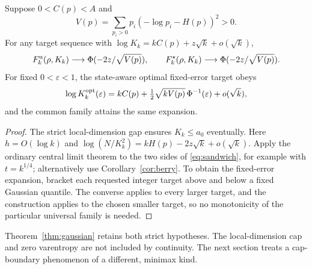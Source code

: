 \begin{theorem}\label{thm:gaussian}
Suppose $0<C(p)<A$ and
\[
 V(p)=\sum_{p_i>0}p_i(-\log p_i-H(p))^2>0.
\]
For any target sequence with $\log K_k=kC(p)+z\sqrt k+o(\sqrt k)$,
\begin{equation}\label{eq:gaussian-limit}
 F_k^{\rm u}(\rho,K_k)\longrightarrow\Phi(-2z/\sqrt{V(p)}),\qquad
 F_k^\star(\rho,K_k)\longrightarrow\Phi(-2z/\sqrt{V(p)}).
\end{equation}
For fixed $0<\varepsilon<1$, the state-aware optimal fixed-error target obeys
\[
 \log K_k^{\rm opt}(\varepsilon)=kC(p)
 +\tfrac12\sqrt{kV(p)}\,\Phi^{-1}(\varepsilon)+o(\sqrt k),
\]
and the common family attains the same expansion.
\end{theorem}
\begin{proof}
The strict local-dimension gap ensures $K_k\le a_0$ eventually. Here $h=O(\log k)$ and $\log(N/K_k^2)=kH(p)-2z\sqrt k+o(\sqrt k)$. Apply the ordinary central limit theorem to the two sides of \eqref{eq:sandwich}, for example with $t=k^{1/4}$; alternatively use Corollary~\ref{cor:berry}. To obtain the fixed-error expansion, bracket each requested integer target above and below a fixed Gaussian quantile. The converse applies to every larger target, and the construction applies to the chosen smaller target, so no monotonicity of the particular universal family is needed.
\end{proof}

Theorem~\ref{thm:gaussian} retains both strict hypotheses. The local-dimension cap and zero varentropy are not included by continuity. The next section treats a cap-boundary phenomenon of a different, minimax kind.

